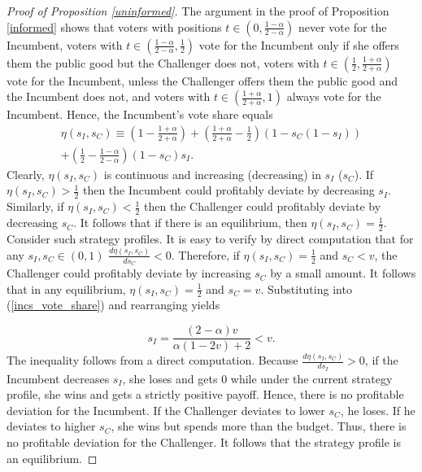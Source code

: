\documentclass[12pt,english]{article}
\begin{document}
\begin{proof}[Proof of Proposition \ref{uninformed}]
The argument in the proof of Proposition \ref{informed} shows that voters with positions $t \in (0,\frac{1 - \alpha}{2 - \alpha})$ never vote for the Incumbent, voters with $t \in (\frac{1 - \alpha}{2 - \alpha},\frac{1}{2})$ vote for the Incumbent only if she offers them the public good but the Challenger does not, voters with $t \in (\frac{1}{2}, \frac{1 + \alpha}{2 + \alpha})$ vote for the Incumbent, unless the Challenger offers them the public good and the Incumbent does not, and voters with $t \in (\frac{1 + \alpha}{2 + \alpha},1)$ always vote for the Incumbent. Hence, the Incumbent's vote share equals 
\begin{equation}
\label{incs_vote_share}
\begin{aligned}
\eta(s_I,s_C) \equiv \left(1-\frac{1 + \alpha }{2 + \alpha }\right)+\left(\frac{1 + \alpha }{2 + \alpha }-\frac{1}{2}\right) (1-s_C (1-s_I))\\+\left(\frac{1}{2}-\frac{1-\alpha }{2-\alpha }\right) (1-s_C) s_I.
\end{aligned}
\end{equation}
Clearly, $\eta(s_I,s_C)$ is continuous and increasing (decreasing) in $s_I$ ($s_C$). If $\eta(s_I,s_C) > \frac{1}{2}$ then the Incumbent could profitably deviate by decreasing $s_I$. Similarly, if $\eta(s_I,s_C) < \frac{1}{2}$ then the Challenger could profitably deviate by decreasing $s_C$. It follows that if there is an equilibrium, then $\eta(s_I,s_C) = \frac{1}{2}$. Consider such strategy profiles. It is easy to verify by direct computation that for any $s_I,s_C\in (0,1)$ $\frac{d \eta(s_I,s_C)}{d s_C} < 0$. Therefore, if $\eta(s_I,s_C) = \frac{1}{2}$ and $s_C < v$, the Challenger could profitably deviate by increasing $s_C$ by a small amount. It follows that in any equilibrium, $\eta(s_I,s_C) = \frac{1}{2}$ and $s_C = v$. Substituting into (\ref{incs_vote_share}) and rearranging yields 

\begin{equation*}
s_I = \frac{(2 - \alpha ) v}{\alpha  (1 - 2 v) + 2} < v.
\end{equation*}
The inequality follows from a direct computation. Because $\frac{d \eta(s_I,s_C)}{d s_I} > 0$, if the Incumbent decreases $s_I$, she loses and gets $0$ while under the current strategy profile, she wins and gets a strictly positive payoff. Hence, there is no profitable deviation for the Incumbent. If the Challenger deviates to lower $s_C$, he loses. If he deviates to higher $s_C$, she wins but spends more than the budget. Thus, there is no profitable deviation for the Challenger. It follows that the strategy profile is an equilibrium. 
\end{proof}
\end{document}
